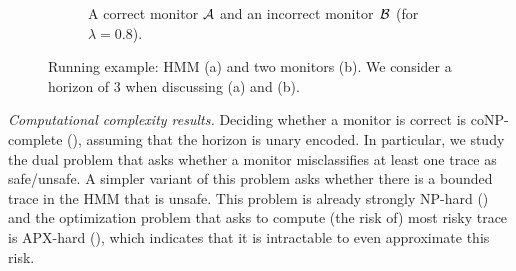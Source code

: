 \documentclass[runningheads]{llncs}
\newcommand{\icy}{{\color{cyan} icy}\xspace}
\newcommand{\dry}{{\color{brown} dry}\xspace}
\renewcommand{\paragraph}[1]{\smallskip\noindent\emph{#1}}
\begin{document}
\begin{figure}[t]
\begin{subfigure}{0.55\textwidth}
        \caption{A correct monitor $\mathcal{A}$ and an incorrect monitor~$\mathcal{B}$ (for $\lambda=0.8$).
        }
        \label{fig:centralmon}
    \end{subfigure}
    \caption{Running example: HMM (a) and two monitors (b). We consider a horizon of 3 when discussing (a) and (b).}
    \label{fig:centralexample}
\end{figure}



\paragraph{Computational complexity results.}
Deciding whether a monitor is correct is coNP-complete (), assuming that the horizon is unary encoded.  In particular, we study the dual problem that asks whether a monitor misclassifies at least one trace as safe/unsafe.
A simpler variant of this problem asks whether there is a bounded trace in the HMM that is unsafe.
This problem is already strongly NP-hard () and the optimization problem that asks to compute (the risk of) most risky trace is APX-hard (), which indicates that it is intractable to even approximate this risk.
\end{document}
